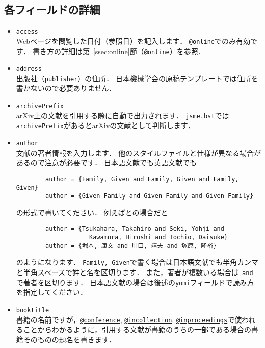 \documentclass[a4paper,fleqn,uplatex,dvipdfmx]{jsarticle}
\newcommand{\jsmefile}{\texttt{jsme.bst}}
\begin{document}
\subsection{各フィールドの詳細}
\label{ssec:field}
\begin{itemize}
    \item \verb|access| \\
        Webページを閲覧した日付（参照日）を記入します．
        \verb|@online|でのみ有効です．
        書き方の詳細は第~\ref{ssec:online}節（\verb|@online|）を参照．
    \item \verb|address| \\
        出版社（\verb|publisher|）の住所．
        日本機械学会の原稿テンプレートでは住所を書かないので必要ありません．
    \item \verb|archivePrefix| \\
        arXiv上の文献を引用する際に自動で出力されます．
        \jsmefile では\verb|archivePrefix|があるとarXivの文献として判断します．
    \item \verb|author| \\
        文献の著者情報を入力します．
        他の\BibTeX{}スタイルファイルと仕様が異なる場合があるので注意が必要です．
        日本語文献でも英語文献でも
        \begin{verbatim}
        author = {Family, Given and Family, Given and Family, Given}
        author = {Given Family and Given Family and Given Family}
        \end{verbatim}
        の形式で書いてください．
        例えば\citet{Tsukahara:TSFP2005}と\citet{堀本:可視化情報2020}の場合だと
        \begin{verbatim}
        author = {Tsukahara, Takahiro and Seki, Yohji and 
                    Kawamura, Hiroshi and Tochio, Daisuke}
        author = {堀本, 康文 and 川口, 靖夫 and 塚原, 隆裕}
        \end{verbatim}
        のようになります．
        \verb|Family, Given|で書く場合は日本語文献でも半角カンマと半角スペースで姓と名を区切ります．
        また，著者が複数いる場合は\verb| and |で著者を区切ります．
        日本語文献の場合は後述の\verb|yomi|フィールドで読み方を指定してください．
    \item \verb|booktitle| \\
        書籍の名前ですが，\hyperref[ssec:conference]{\texttt{@conference}}, \hyperref[ssec:incollection]{\texttt{@incollection}}, \hyperref[ssec:inproceedings]{\texttt{@inproceedings}}で使われることからわかるように，引用する文献が書籍のうちの一部である場合の書籍そのものの題名を書きます．

\end{itemize}
\end{document}
